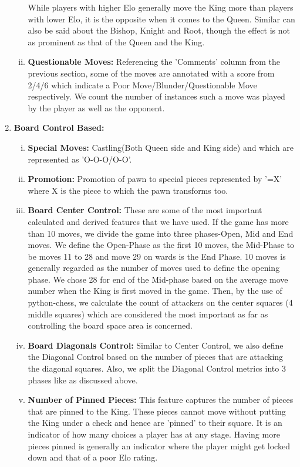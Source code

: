 \documentclass[11pt,a4paper]{article}
\begin{document}
\begin{enumerate}[I]
\begin{enumerate}[(i)]
    While players with higher Elo generally move the King more than players with lower Elo, it is the opposite when it comes to the Queen. Similar can also be said about the Bishop, Knight and Root, though the effect is not as prominent as that of the Queen and the King.
    
    
    \item \textbf{Questionable Moves:} Referencing the 'Comments' column from the previous section, some of the moves are annotated with a score from 2/4/6 which indicate a Poor Move/Blunder/Questionable Move respectively. We count the number of instances such a move was played by the player as well as the opponent.
    
\end{enumerate}

    \item \textbf{Board Control Based:}
    \begin{enumerate}[(i)]
        \item \textbf{Special Moves:} Castling(Both Queen side and King side) and which are represented as 'O-O-O/O-O'.
        \item \textbf{Promotion:} Promotion of pawn to special pieces represented by '=X' where X is the piece to which the pawn transforms too.
        \item \textbf{Board Center Control:} These are some of the most important calculated and derived features that we have used. If the game has more than 10 moves, we divide the game into three phases-Open, Mid and End moves. We define the Open-Phase as the first 10 moves, the Mid-Phase to be moves 11 to 28 and move 29 on wards is the End Phase. 10 moves is generally regarded as the number of moves used to define the opening phase. We chose 28 for end of the Mid-phase based on the average move number when the King is first moved in the game. Then, by the use of python-chess, we calculate the count of attackers on the center squares (4 middle squares) which are considered the most important as far as controlling the board space area is concerned.
        \item \textbf{Board Diagonals Control:} Similar to Center Control, we also define the Diagonal Control based on the number of pieces that are attacking the diagonal squares. Also, we split the Diagonal Control metrics into 3 phases like as discussed above.
        \item \textbf{Number of Pinned Pieces:} This feature captures the number of pieces that are pinned to the King. These pieces cannot move without putting the King under a check and hence are 'pinned' to their square. It is an indicator of how many choices a player has at any stage. Having more pieces pinned is generally an indicator where the player might get locked down and that of a poor Elo rating.


\end{enumerate}
\end{enumerate}
\end{document}
